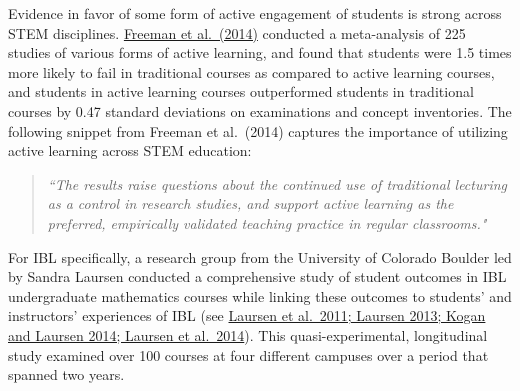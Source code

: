 \documentclass[11pt]{article}%
\newcommand{\blankline}{\pagebreak[2]\vspace{.5\baselineskip}}
\begin{document}
Evidence in favor of some form of active engagement of students is strong across STEM disciplines. \href{https://pubmed.ncbi.nlm.nih.gov/24821756/}{Freeman et al.~(2014)} conducted a meta-analysis of 225 studies of various forms of active learning, and found that students were 1.5 times more likely to fail in traditional courses as compared to active learning courses, and students in active learning courses outperformed students in traditional courses by 0.47 standard deviations on examinations and concept inventories. The following snippet from Freeman et al.~(2014) captures the importance of utilizing active learning across STEM education:
\begin{quote}
\emph{``The results raise questions about the continued use of traditional lecturing as a control in research studies, and support active learning as the preferred, empirically validated teaching practice in regular classrooms."}
\end{quote}

For IBL specifically, a research group from the University of Colorado Boulder led by Sandra Laursen conducted a comprehensive study of student outcomes in IBL undergraduate mathematics courses while linking these outcomes to students' and instructors' experiences of IBL (see \href{https://www.colorado.edu/eer/research-areas/student-centered-stem-education/inquiry-based-learning-college-mathematics}{Laursen et al.~2011; Laursen 2013; Kogan and Laursen 2014; Laursen et al.~2014}). This quasi-experimental, longitudinal study examined over 100 courses at four different campuses over a period that spanned two years.

\blankline
\end{document}
